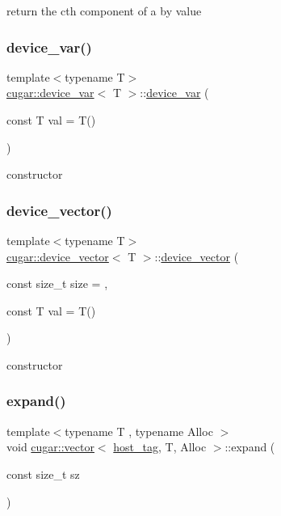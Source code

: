 return the c\textquotesingle{}th component of a by value \mbox{\label{group___basic_ga011df6d3d281ae52a529e835ba1aad8e}} 
\subsubsection{\texorpdfstring{device\+\_\+var()}{device\_var()}}
{\footnotesize\ttfamily template$<$typename T$>$ \\
\hyperlink{structcugar_1_1device__var}{cugar\+::device\+\_\+var}$<$ T $>$\+::\hyperlink{structcugar_1_1device__var}{device\+\_\+var} (\begin{DoxyParamCaption}\item[{const T}]{val = {\ttfamily T()} }\end{DoxyParamCaption})\hspace{0.3cm}{\ttfamily [inline]}}

constructor \mbox{\label{group___basic_ga9a8d64513864f07fe5e576a13980fafe}} 
\subsubsection{\texorpdfstring{device\+\_\+vector()}{device\_vector()}}
{\footnotesize\ttfamily template$<$typename T$>$ \\
\hyperlink{structcugar_1_1device__vector}{cugar\+::device\+\_\+vector}$<$ T $>$\+::\hyperlink{structcugar_1_1device__vector}{device\+\_\+vector} (\begin{DoxyParamCaption}\item[{const size\+\_\+t}]{size = {},  }\item[{const T}]{val = {\ttfamily T()} }\end{DoxyParamCaption})\hspace{0.3cm}{\ttfamily [inline]}}

constructor \mbox{\label{group___basic_ga8974bf847d3e9ef8bbf2e6318c001087}} 
\subsubsection{\texorpdfstring{expand()}{expand()}\hspace{0.1cm}{\footnotesize\ttfamily [1/2]}}
{\footnotesize\ttfamily template$<$typename T , typename Alloc $>$ \\
void \hyperlink{structcugar_1_1vector}{cugar\+::vector}$<$ \hyperlink{structcugar_1_1host__tag}{host\+\_\+tag}, T, Alloc $>$\+::expand (\begin{DoxyParamCaption}\item[{const size\+\_\+t}]{sz }\end{DoxyParamCaption})\hspace{0.3cm}{\ttfamily [inline]}}

